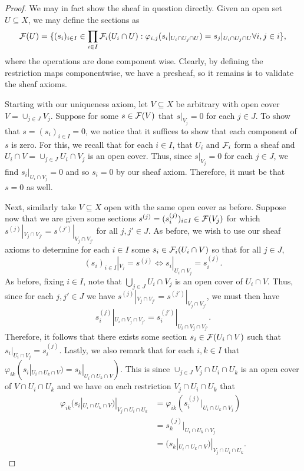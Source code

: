 \begin{proof}
    We may in fact show the sheaf in question directly.
    Given an open set $U \subseteq X$, we may define the sections as
    \[
        \mathcal{F}(U) = \{ 
            (s_i)_{i \in I} \in \prod_{i \in I} \mathcal{F}_i(U_i \cap U): 
            \varphi_{i, j}(s_i|_{U_i \cap U_j \cap U}) = s_j|_{U_i \cap U_j \cap U} \forall i, j \in i
        \},
    \]
    where the operations are done component wise.
    Clearly, by defining the restriction maps componentwise,
    we have a presheaf, so it remains is to validate the sheaf axioms.

    Starting with our uniqueness axiom, let $V \subseteq X$ be arbitrary with open cover $V = \cup_{j \in J} V_j$.
    Suppose for some $s \in \mathcal{F}(V)$ that $s|_{V_j} = 0$ for each $j \in J$.
    To show that $s = (s_i)_{i \in I}= 0$, we notice that it suffices to show that each component of $s$ is zero.
    For this, we recall that for each $i \in I$, that $U_i$ and $\mathcal{F}_i$ form a sheaf and $U_i \cap V = \cup_{j \in J} U_i \cap V_j$ is an open cover.
    Thus, since $s|_{V_j} = 0$ for each $j \in J$, we find $s_i|_{U_i \cap V_j} = 0$ and so $s_i = 0$ by our sheaf axiom.
    Therefore, it must be that $s = 0$ as well.

    Next, similarly take $V \subseteq X$ open with the same open cover as before. 
    Suppose now that we are given some sections $s^{(j)} = (s^{(j)}_i)_{i \in I} \in \mathcal{F}(V_j)$ for which $s^{(j)}|_{V_j \cap V_{j'}} = s^{(j')}|_{V_j \cap V_{j'}}$ for all $j, j' \in J$.
    As before, we wish to use our sheaf axioms to determine for each $i \in I$ some $s_i \in \mathcal{F}_i(U_i \cap V)$ so that for all $j \in J$,
    \[
        (s_i)_{i \in I}|_{V_j} = s^{(j)}
        \iff s_i|_{U_i \cap V_j} = s^{(j)}_i.
    \]
    As before, fixing $i \in I$, note that $\bigcup_{j \in J} U_i \cap V_j$ is an open cover of $U_i \cap V$.
    Thus, since for each $j, j' \in J$ we have $s^{(j)}|_{V_j \cap V_{j'}} = s^{(j')}|_{V_j \cap V_{j'}}$, we must then have
    \[
        s^{(j)}_i|_{U_i \cap V_j \cap V_{{j'}}}
        = s_i^{(j')}|_{U_i \cap V_j \cap V_{{j'}}}.
    \]
    Therefore, it follows that there exists some section $s_i \in \mathcal{F}(U_i \cap V)$ such that $s_i|_{U_i \cap V_j} = s^{(j)}_i$.
    Lastly, we also remark that for each $i, k \in I$ that $\varphi_{ik}(s_i|_{U_i \cap U_k \cap V}) = s_k|_{U_i \cap U_k \cap V})$.
    This is since $\cup_{j \in J} V_j \cap U_i \cap U_k$ is an open cover of $V \cap U_i \cap U_k$ and we have on each restriction $V_j \cap U_i \cap U_k$ that
    \begin{align*}
        \varphi_{ik}(s_i|_{U_i \cap U_k \cap V})|_{V_j \cap U_i \cap U_k}
        & = \varphi_{ik}(s^{(j)}_i|_{U_i \cap U_k \cap V_j}) \\
        & = s^{(j)}_k|_{U_i \cap U_k \cap V_j} \\
        & =(s_k|_{U_i \cap U_k \cap V})|_{V_j \cap U_i \cap U_k}.
    \end{align*}


\end{proof}
